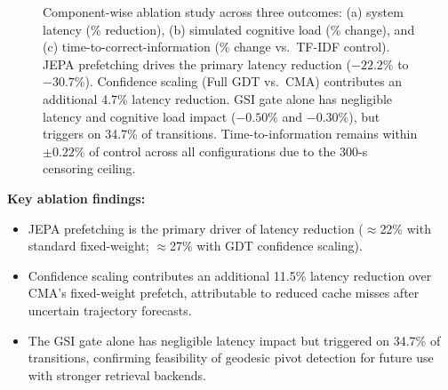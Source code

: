 \documentclass[11pt]{article}
\begin{document}
\begin{figure}[htbp]
  \caption{Component-wise ablation study across three outcomes: (a) system latency (\% reduction), (b) simulated cognitive load (\% change), and (c) time-to-correct-information (\% change vs.\ TF-IDF control). JEPA prefetching drives the primary latency reduction ($-22.2\%$ to $-30.7\%$). Confidence scaling (Full GDT vs.\ CMA) contributes an additional 4.7\% latency reduction. GSI gate alone has negligible latency and cognitive load impact ($-0.50\%$ and $-0.30\%$), but triggers on 34.7\% of transitions. Time-to-information remains within ${\pm}0.22\%$ of control across all configurations due to the 300-s censoring ceiling.}
  \label{fig:ablation}
\end{figure}

\textbf{Key ablation findings:}
\begin{itemize}
  \item JEPA prefetching is the primary driver of latency reduction ($\approx$22\% with standard fixed-weight; $\approx$27\% with GDT confidence scaling).
  \item Confidence scaling contributes an additional 11.5\% latency reduction over CMA's fixed-weight prefetch, attributable to reduced cache misses after uncertain trajectory forecasts.
  \item The GSI gate alone has negligible latency impact but triggered on 34.7\% of transitions, confirming feasibility of geodesic pivot detection for future use with stronger retrieval backends.
\end{itemize}
\end{document}
